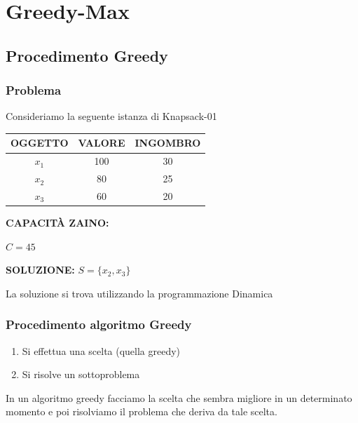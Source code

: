 \chapter{Greedy-Max}
\section{Procedimento Greedy}

\subsection{Problema}
\begin{center}
    Consideriamo la seguente istanza di Knapsack-01
\end{center}

\begin{minipage}[t]{0.55\textwidth}
    \centering
    \begin{tabular}{ccc}
        \textbf{OGGETTO} & \textbf{VALORE} & \textbf{INGOMBRO} \\
        \midrule
        $x_1$ & 100 & 30 \\
        $x_2$ & 80  & 25 \\
        $x_3$ & 60  & 20 \\
    \end{tabular}
\end{minipage}
\hfill
\begin{minipage}[t]{0.4\textwidth}
    \textbf{CAPACITÀ ZAINO:}
    \vspace{0.5em}
    
    $C = 45$
\end{minipage}

\vspace{2em}

\noindent \textbf{SOLUZIONE:} \quad $S = \{x_2, x_3\}$

La soluzione si trova utilizzando la programmazione Dinamica

\subsection{Procedimento algoritmo Greedy}
\begin{enumerate}
    \item Si effettua una scelta (quella greedy)
    \item Si risolve un sottoproblema
\end{enumerate}

In un algoritmo greedy facciamo la scelta che sembra migliore in un determinato momento e poi risolviamo il problema che deriva da tale scelta.

